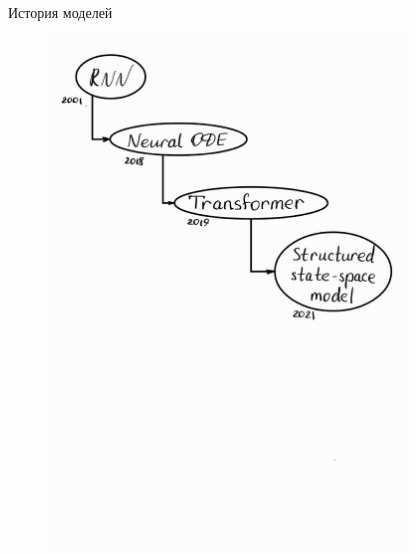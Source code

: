 \documentclass[10pt,pdf,hyperref={unicode}]{beamer}
\begin{document}
\begin{frame}{История моделей}
	\begin{figure}
		\includegraphics[width=0.85\textwidth]{ts-models-history.pdf}
	\end{figure}
\end{frame}
\end{document}
